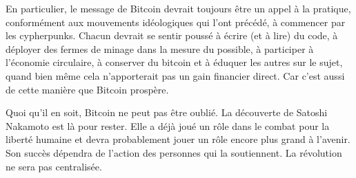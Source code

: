 En particulier, le message de Bitcoin devrait toujours être un appel à la pratique, conformément aux mouvements idéologiques qui l'ont précédé, à commencer par les cypherpunks. Chacun devrait se sentir poussé à écrire (et à lire) du code, à déployer des fermes de minage dans la mesure du possible, à participer à l'économie circulaire, à conserver du bitcoin et à éduquer les autres sur le sujet, quand bien même cela n'apporterait pas un gain financier direct. Car c'est aussi de cette manière que Bitcoin prospère.

Quoi qu'il en soit, Bitcoin ne peut pas être oublié. La découverte de Satoshi Nakamoto est là pour rester. Elle a déjà joué un rôle dans le combat pour la liberté humaine et devra probablement jouer un rôle encore plus grand à l'avenir. Son succès dépendra de l'action des personnes qui la soutiennent. La révolution ne sera pas centralisée.
